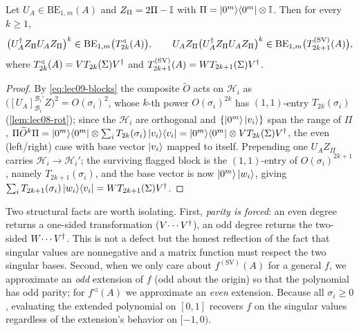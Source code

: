 \begin{theorem}
\label{thm:lec09-cheb}
Let $U_A\in\mathrm{BE}_{1,m}(A)$ and $Z_\Pi=2\Pi-\mathbb{I}$ with $\Pi=\ket{0^m}\!\bra{0^m}\otimes\mathbb{I}$.
Then for every $k\ge1$,
\begin{equation}
  \bigl(U_A^{\dagger} Z_\Pi U_A Z_\Pi\bigr)^k
    \in\mathrm{BE}_{1,m}\bigl(T_{2k}^{\triangleleft}(A)\bigr),\qquad
  U_A Z_\Pi\bigl(U_A^{\dagger} Z_\Pi U_A Z_\Pi\bigr)^k
    \in\mathrm{BE}_{1,m}\bigl(T_{2k+1}^{(\mathrm{SV})}(A)\bigr),
  \label{eq:lec09-chebBE}
\end{equation}
where $T_{2k}^{\triangleleft}(A)=V T_{2k}(\Sigma)V^{\dagger}$ and
$T_{2k+1}^{(\mathrm{SV})}(A)=W T_{2k+1}(\Sigma)V^{\dagger}$.
\end{theorem}

\begin{proof}
By \eqref{eq:lec09-blocks} the composite $\widetilde O$ acts on $\mathcal H_i$ as
$\bigl([U_A]^{\mathcal B_i'}_{\mathcal B_i}Z\bigr)^2=O(\sigma_i)^2$, whose $k$-th power
$O(\sigma_i)^{2k}$ has $(1,1)$-entry $T_{2k}(\sigma_i)$ (\cref{lem:lec08-rot}); since
the $\mathcal H_i$ are orthogonal and $\{\ket{0^m}\ket{v_i}\}$ span the range of $\Pi$,
$\Pi\widetilde O^k\Pi=\ket{0^m}\!\bra{0^m}\otimes\sum_i T_{2k}(\sigma_i)\ket{v_i}\!\bra{v_i}
=\ket{0^m}\!\bra{0^m}\otimes V T_{2k}(\Sigma)V^{\dagger}$, the even (left/right) case with base vector
$\ket{v_i}$ mapped to itself. Prepending one $U_A Z_\Pi$ carries
$\mathcal H_i\to\mathcal H_i'$; the surviving flagged block is the $(1,1)$-entry of
$O(\sigma_i)^{2k+1}$, namely $T_{2k+1}(\sigma_i)$, and the base vector is now
$\ket{0^m}\ket{w_i}$, giving $\sum_i T_{2k+1}(\sigma_i)\ket{w_i}\!\bra{v_i}=
W T_{2k+1}(\Sigma)V^{\dagger}$.
\end{proof}

Two structural facts are worth isolating. First, \emph{parity is forced}: an even
degree returns a one-sided transformation ($V\!\cdots V^{\dagger}$), an odd degree returns the
two-sided $W\!\cdots V^{\dagger}$. This is not a defect but the honest reflection of the fact
that singular values are nonnegative and a matrix function must respect the two
singular bases. Second, when we only care about $f^{(\mathrm{SV})}(A)$ for a general
$f$, we approximate an \emph{odd} extension of $f$ (odd about the origin) so that the
polynomial has odd parity; for $f^{\triangleleft}(A)$ we approximate an \emph{even}
extension. Because all $\sigma_i\ge0$, evaluating the extended polynomial on $[0,1]$
recovers $f$ on the singular values regardless of the extension's behavior on $[-1,0)$.

